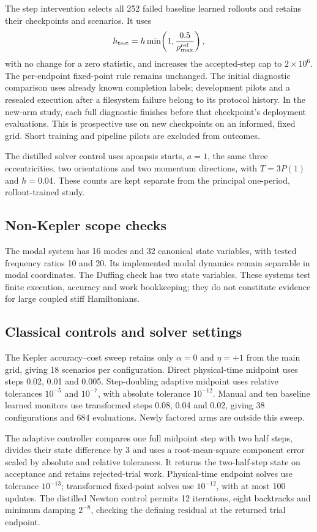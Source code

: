 \documentclass[11pt]{article}
\begin{document}
The step intervention selects all 252 failed baseline learned rollouts
and retains their checkpoints and scenarios. It uses
\[
h_{\rm test}=h\min\!\left(1,\frac{0.5}{\rho_{\max}^{\rm ref}}\right),
\]
with no change for a zero statistic, and increases the accepted-step cap
to $2\times10^6$. The per-endpoint fixed-point rule remains unchanged.
The initial diagnostic comparison uses already known completion labels;
development pilots and a resealed execution after a filesystem failure
belong to its protocol history. In the new-arm study, each full diagnostic
finishes before that checkpoint's deployment evaluations. This is
prospective use on new checkpoints on an informed, fixed grid. Short
training and pipeline pilots are excluded from outcomes.

The distilled solver control uses apoapsis starts, $a=1$, the same three
eccentricities, two orientations and two momentum directions, with
$T=3P(1)$ and $h=0.04$. These counts are kept separate from the principal
one-period, rollout-trained study.

\subsection{Non-Kepler scope checks}

The modal system has 16 modes and 32 canonical state variables, with tested
frequency ratios 10 and 20. Its implemented modal dynamics remain separable
in modal coordinates. The Duffing check has two state variables. These
systems test finite execution, accuracy and work bookkeeping; they do not
constitute evidence for large coupled stiff Hamiltonians.

\subsection{Classical controls and solver settings}

The Kepler accuracy--cost sweep retains only $\alpha=0$ and $\eta=+1$
from the main grid, giving 18 scenarios per configuration. Direct
physical-time midpoint uses steps 0.02, 0.01 and 0.005. Step-doubling
adaptive midpoint uses relative tolerances $10^{-5}$ and $10^{-7}$,
with absolute tolerance $10^{-12}$. Manual and ten baseline learned
monitors use transformed steps 0.08, 0.04 and 0.02, giving 38 configurations
and 684 evaluations. Newly factored arms are outside this sweep.

The adaptive controller compares one full midpoint step with two half
steps, divides their state difference by 3 and uses a root-mean-square
component error scaled by absolute and relative tolerances. It returns
the two-half-step state on acceptance and retains rejected-trial work.
Physical-time endpoint solves use tolerance $10^{-13}$; transformed
fixed-point solves use $10^{-12}$, with at most 100 updates.
The distilled Newton control permits 12 iterations, eight backtracks and
minimum damping $2^{-8}$, checking the defining residual at the returned
trial endpoint.
\end{document}
